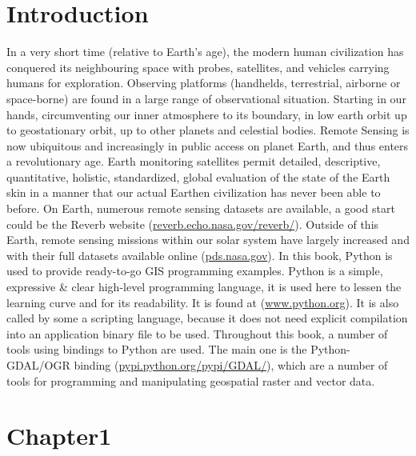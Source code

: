 \documentclass[10pt]{book}
\begin{document}
\chapter{Introduction}
In a very short time (relative to Earth's age), the modern human civilization has conquered its neighbouring space with
probes, satellites, and vehicles carrying humans for exploration. Observing platforms (handhelds, 
terrestrial, airborne or space-borne) are found in a large range of observational situation. 
Starting in our hands, circumventing our inner atmosphere to its boundary, in low earth orbit up to geostationary orbit,
up to other planets and celestial bodies.\newline\linebreak
Remote Sensing is now ubiquitous and increasingly in public access on planet Earth, and thus enters a revolutionary age.
Earth monitoring satellites permit detailed, descriptive, quantitative, holistic, standardized, global evaluation
of the state of the Earth skin in a manner that our actual Earthen civilization has never been able to before.\newline\linebreak
On Earth, numerous remote sensing datasets are available, a good start could be the Reverb website 
(\href{http://reverb.echo.nasa.gov/reverb/}{reverb.echo.nasa.gov/reverb/}). Outside of this Earth, remote sensing missions 
within our solar system have largely increased and with their full datasets available online 
(\href{http://pds.nasa.gov}{pds.nasa.gov}).\newline\linebreak
In this book, Python is used to provide ready-to-go GIS programming examples. Python is a simple, expressive \& clear 
high-level programming language, it is used here to lessen the learning curve and for its readability. It is found at
(\href{http://www.python.org}{www.python.org}). It is also called by some a scripting language,
because it does not need explicit compilation into an application binary file to be used. Throughout this book, a number of
tools using bindings to Python are used. The main one is the Python-GDAL/OGR binding 
(\href{http://pypi.python.org/pypi/GDAL/}{pypi.python.org/pypi/GDAL/}), which are a number of tools for programming
and manipulating geospatial raster and vector data.\newline
\newpage


\chapter{Chapter1}
\end{document}
